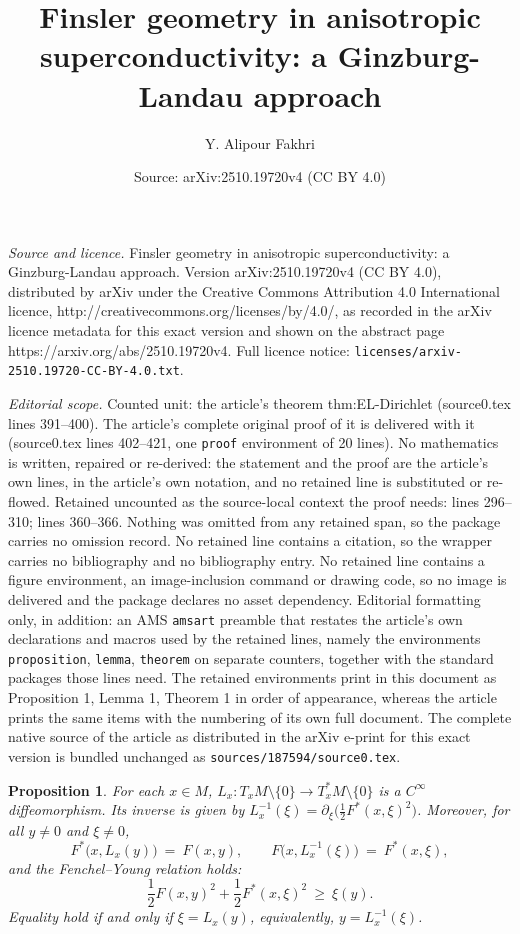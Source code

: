 \documentclass[10pt,a4paper]{amsart}
\title{Finsler geometry in anisotropic superconductivity: a Ginzburg-Landau approach}
\author{Y. Alipour Fakhri}
\date{Source: arXiv:2510.19720v4 (CC BY 4.0)}
\newtheorem{proposition}{Proposition}
\begin{document}
\maketitle

\noindent\emph{Source and licence.} Finsler geometry in anisotropic superconductivity: a Ginzburg-Landau approach. Version arXiv:2510.19720v4 (CC BY 4.0), distributed by arXiv under the Creative Commons Attribution 4.0 International licence, http://creativecommons.org/licenses/by/4.0/, as recorded in the arXiv licence metadata for this exact version and shown on the abstract page https://arxiv.org/abs/2510.19720v4. Full licence notice: \texttt{licenses/arxiv-2510.19720-CC-BY-4.0.txt}.\par\smallskip

\noindent\textit{Editorial scope.} Counted unit: the article's theorem thm:EL-Dirichlet (source0.tex lines 391--400). The article's complete original proof of it is delivered with it (source0.tex lines 402--421, one \texttt{proof} environment of 20 lines). No mathematics is written, repaired or re-derived: the statement and the proof are the article's own lines, in the article's own notation, and no retained line is substituted or re-flowed.  Retained uncounted as the source-local context the proof needs: lines 296--310; lines 360--366.  Nothing was omitted from any retained span, so the package carries no omission record.  No retained line contains a citation, so the wrapper carries no bibliography and no bibliography entry.  No retained line contains a figure environment, an image-inclusion command or drawing code, so no image is delivered and the package declares no asset dependency.  Editorial formatting only, in addition: an AMS \texttt{amsart} preamble that restates the article's own declarations and macros used by the retained lines, namely the environments \texttt{proposition}, \texttt{lemma}, \texttt{theorem} on separate counters, together with the standard packages those lines need.  The retained environments print in this document as Proposition 1, Lemma 1, Theorem 1 in order of appearance, whereas the article prints the same items with the numbering of its own full document.  The complete native source of the article as distributed in the arXiv e-print for this exact version is bundled unchanged as \texttt{sources/187594/source0.tex}.
\begin{proposition}\label{prop:Legendre-diffeo}
For each $x\in M$, $L_x:T_xM\setminus\{0\}\to T_x^*M\setminus\{0\}$ is a $C^\infty$ diffeomorphism.
Its inverse is given by $L_x^{-1}(\xi)=\partial_\xi\!\big(\tfrac 12 F^*(x,\xi)^2\big)$.
Moreover, for all $y\neq 0$ and $\xi\neq 0$,
\begin{equation}\label{eq:F-Fstar-compat}
F^*\!\big(x,L_x(y)\big)\ =\ F(x,y),\qquad
F\!\big(x,L_x^{-1}(\xi)\big)\ =\ F^*(x,\xi),
\end{equation}
and the Fenchel--Young relation holds:
\begin{equation}\label{eq:Fenchel-Young}
\frac 12 F(x,y)^2 + \frac 12 F^*(x,\xi)^2 \ \ge\ \xi(y).
\end{equation}
Equality hold if and only if $\xi=L_x(y)$, equivalently, $y=L_x^{-1}(\xi)$.
\end{proposition}
\end{document}
